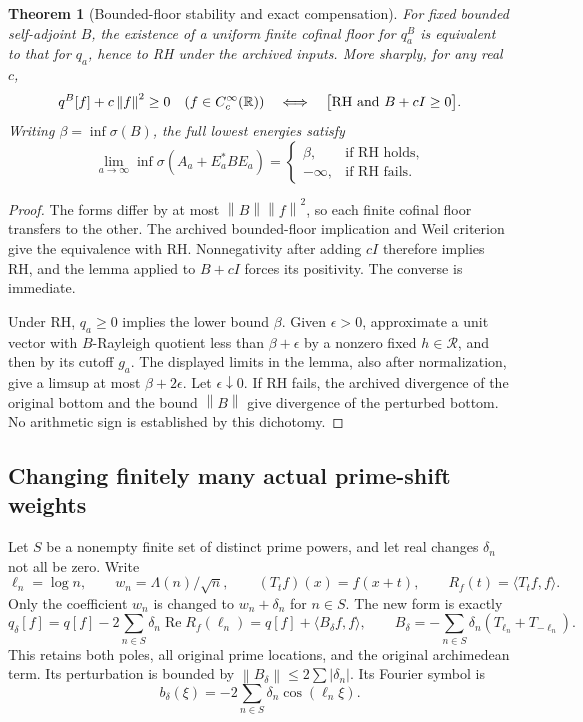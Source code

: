 \documentclass[11pt]{article}
\newtheorem{theorem}{Theorem}[section]
\theoremstyle{remark}
\newcommand{\norm}[1]{\left\lVert #1\right\rVert}
\begin{document}
\begin{theorem}[Bounded-floor stability and exact compensation]\label{thm:ns57-bounded-floor-stability}
For fixed bounded self-adjoint $B$, the existence of a uniform finite
cofinal floor for $q_a^B$ is equivalent to that for $q_a$, hence to RH
under the archived inputs. More sharply, for any real $c$,
\[
 q^B[f]+c\norm f^2\ge0\quad(f\in C_c^\infty(\mathbb R))
 \quad\Longleftrightarrow\quad
 \bigl[\mathrm{RH}\ \hbox{and}\ B+cI\ge0\bigr].
\]
Writing $\beta=\inf\sigma(B)$, the full lowest energies satisfy
\[
 \lim_{a\to\infty}\inf\sigma(A_a+E_a^*BE_a)
 =\begin{cases}\beta,&\text{if RH holds},\\-\infty,&\text{if RH fails}.
 \end{cases}
\]
\end{theorem}
\begin{proof}
The forms differ by at most $\norm B\norm f^2$, so each finite
cofinal floor transfers to the other. The archived bounded-floor
implication and Weil criterion give the equivalence with RH.
Nonnegativity after adding $cI$ therefore implies RH, and the lemma
applied to $B+cI$ forces its positivity. The converse is immediate.

Under RH, $q_a\ge0$ implies the lower bound $\beta$. Given
$\epsilon>0$, approximate a unit vector with $B$-Rayleigh quotient
less than $\beta+\epsilon$ by a nonzero fixed $h\in\mathcal R$,
and then by its cutoff $g_a$. The displayed limits in the lemma,
also after normalization, give a limsup at most $\beta+2\epsilon$.
Let $\epsilon\downarrow0$. If RH fails, the archived divergence
of the original bottom and the bound $\norm B$ give divergence
of the perturbed bottom. No arithmetic sign is established by this dichotomy.
\end{proof}

\subsection*{Changing finitely many actual prime-shift weights}
Let $S$ be a nonempty finite set of distinct prime powers, and let
real changes $\delta_n$ not all be zero. Write
\[
 \ell_n=\log n,\qquad w_n=\Lambda(n)/\sqrt n,\qquad
 (T_tf)(x)=f(x+t),\qquad R_f(t)=\langle T_tf,f\rangle.
\]
Only the coefficient $w_n$ is changed to $w_n+\delta_n$ for $n\in S$.
The new form is exactly
\[
 q_\delta[f]=q[f]-2\sum_{n\in S}\delta_n\operatorname{Re}R_f(\ell_n)
            =q[f]+\langle B_\delta f,f\rangle,
 \qquad B_\delta=-\sum_{n\in S}\delta_n(T_{\ell_n}+T_{-\ell_n}).
\]
This retains both poles, all original prime locations, and the original
archimedean term. Its perturbation is bounded by
$\norm{B_\delta}\le2\sum|\delta_n|$. Its Fourier symbol is
\[
 b_\delta(\xi)=-2\sum_{n\in S}\delta_n\cos(\ell_n\xi).
\]
\end{document}
